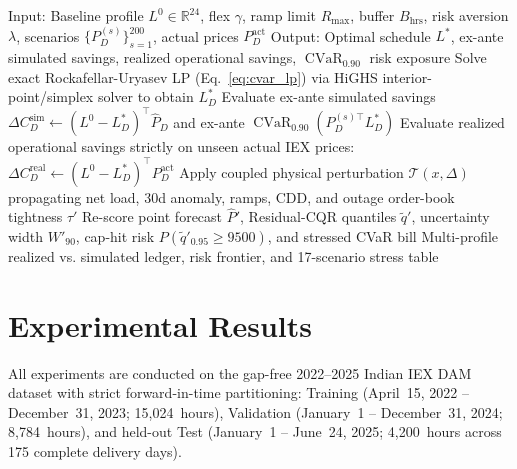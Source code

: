 \documentclass[runningheads,a4paper]{llncs}
\begin{document}
\begin{algorithm}[!t]
\caption{Stochastic CVaR-Constrained Procurement Optimization and Multi-Disturbance Risk Stress Testing}
\label{alg:stoch_opt}
\footnotesize
\begin{algorithmic}[1]
\State Input: Baseline profile $L^0 \in \mathbb{R}^{24}$, flex $\gamma$, ramp limit $R_{\max}$, buffer $B_{\text{hrs}}$, risk aversion $\lambda$, scenarios $\{P_D^{(s)}\}_{s=1}^{200}$, actual prices $P_D^{\text{act}}$
\State Output: Optimal schedule $L^*$, ex-ante simulated savings, realized operational savings, $\operatorname{CVaR}_{0.90}$ risk exposure
    \State Solve exact Rockafellar-Uryasev LP (Eq.~\ref{eq:cvar_lp}) via HiGHS interior-point/simplex solver to obtain $L_D^*$
    \State Evaluate ex-ante simulated savings $\Delta C_D^{\text{sim}} \gets (L^0 - L_D^*)^\top \hat{P}_D$ and ex-ante $\operatorname{CVaR}_{0.90}(P_D^{(s)\top} L_D^*)$
    \State Evaluate realized operational savings strictly on unseen actual IEX prices: $\Delta C_D^{\text{real}} \gets (L^0 - L_D^*)^\top P_D^{\text{act}}$
\EndFor
{}
    \State Apply coupled physical perturbation $\mathcal{T}(x, \Delta)$ propagating net load, 30d anomaly, ramps, CDD, and outage order-book tightness $\tau'$
    \State Re-score point forecast $\hat{P}'$, Residual-CQR quantiles $\tilde{q}'$, uncertainty width $W'_{90}$, cap-hit risk $P(\tilde{q}'_{0.95}\ge 9500)$, and stressed CVaR bill
\EndFor
\State \Return Multi-profile realized vs. simulated ledger, risk frontier, and 17-scenario stress table
\end{algorithmic}
\end{algorithm}

\section{Experimental Results}
All experiments are conducted on the gap-free 2022--2025 Indian IEX DAM dataset with strict forward-in-time partitioning: Training (April~15, 2022 -- December~31, 2023; 15,024~hours), Validation (January~1 -- December~31, 2024; 8,784~hours), and held-out Test (January~1 -- June~24, 2025; 4,200~hours across 175 complete delivery days).
\end{document}
